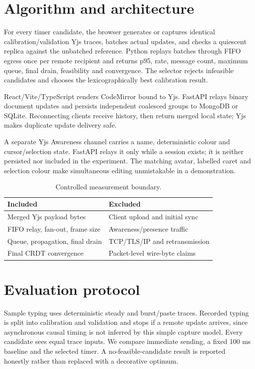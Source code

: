\documentclass[10pt]{article}
\begin{document}
\clearpage
\section{Algorithm and architecture}
For every timer candidate, the browser generates or captures identical calibration/validation Yjs traces, batches actual updates, and checks a quiescent replica against the unbatched reference. Python replays batches through FIFO egress once per remote recipient and returns p95, rate, message count, maximum queue, final drain, feasibility and convergence. The selector rejects infeasible candidates and chooses the lexicographically best calibration result.

React/Vite/TypeScript renders CodeMirror bound to Yjs. FastAPI relays binary document updates and persists independent coalesced groups to MongoDB or SQLite. Reconnecting clients receive history, then return merged local state; Yjs makes duplicate update delivery safe.

A separate Yjs Awareness channel carries a name, deterministic colour and cursor/selection state. FastAPI relays it only while a session exists; it is neither persisted nor included in the experiment. The matching avatar, labelled caret and selection colour make simultaneous editing unmistakable in a demonstration.

\begin{table}[h]
\centering
\caption{Controlled measurement boundary.}
\begin{tabular}{ll}
\toprule
Included & Excluded\\
\midrule
Merged Yjs payload bytes & Client upload and initial sync\\
FIFO relay, fan-out, frame size & Awareness/presence traffic\\
Queue, propagation, final drain & TCP/TLS/IP and retransmission\\
Final CRDT convergence & Packet-level wire-byte claims\\
\bottomrule
\end{tabular}
\end{table}

\section{Evaluation protocol}
Sample typing uses deterministic steady and burst/paste traces. Recorded typing is split into calibration and validation and stops if a remote update arrives, since asynchronous causal timing is not inferred by this simple capture model. Every candidate sees equal trace inputs. We compare immediate sending, a fixed 100 ms baseline and the selected timer. A no-feasible-candidate result is reported honestly rather than replaced with a decorative optimum.
\end{document}
